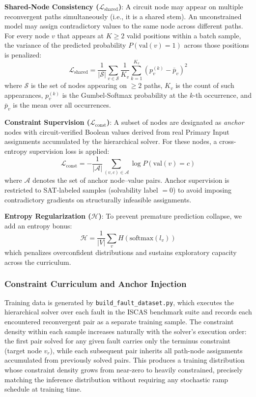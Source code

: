 \documentclass[conference]{IEEEtran}
\begin{document}
\textbf{Shared-Node Consistency ($\mathcal{L}_{\text{shared}}$)}: A circuit node may appear on multiple reconvergent paths simultaneously (i.e., it is a shared stem). An unconstrained model may assign contradictory values to the same node across different paths. For every node $v$ that appears at $K \geq 2$ valid positions within a batch sample, the variance of the predicted probability $P(\text{val}(v)=1)$ across those positions is penalized:
\begin{equation}
   \mathcal{L}_{\text{shared}} = \frac{1}{|\mathcal{S}|}\sum_{v \in \mathcal{S}}
      \frac{1}{K_v}\sum_{k=1}^{K_v}\!\left(p_v^{(k)} - \bar{p}_v\right)^2
\end{equation}
where $\mathcal{S}$ is the set of nodes appearing on $\geq 2$ paths, $K_v$ is the count of such appearances, $p_v^{(k)}$ is the Gumbel-Softmax probability at the $k$-th occurrence, and $\bar{p}_v$ is the mean over all occurrences.

\textbf{Constraint Supervision ($\mathcal{L}_{\text{const}}$)}: A subset of nodes are designated as \textit{anchor} nodes with circuit-verified Boolean values derived from real Primary Input assignments accumulated by the hierarchical solver. For these nodes, a cross-entropy supervision loss is applied:
\begin{equation}
   \mathcal{L}_{\text{const}} = -\frac{1}{|\mathcal{A}|} \sum_{(v,c) \in \mathcal{A}} \log P(\text{val}(v) = c)
\end{equation}
where $\mathcal{A}$ denotes the set of anchor node--value pairs. Anchor supervision is restricted to SAT-labeled samples (solvability label $= 0$) to avoid imposing contradictory gradients on structurally infeasible assignments.

\textbf{Entropy Regularization ($\mathcal{H}$)}: To prevent premature prediction collapse, we add an entropy bonus:
\begin{equation}
   \mathcal{H} = \frac{1}{|V|}\sum_v H\!\left(\text{softmax}(l_v)\right)
\end{equation}
which penalizes overconfident distributions and sustains exploratory capacity across the curriculum.

\subsubsection{Constraint Curriculum and Anchor Injection}
Training data is generated by \texttt{build\_fault\_dataset.py}, which executes the hierarchical solver over each fault in the ISCAS benchmark suite and records each encountered reconvergent pair as a separate training sample. The constraint density within each sample increases naturally with the solver's execution order: the first pair solved for any given fault carries only the terminus constraint (target node $v_r$), while each subsequent pair inherits all path-node assignments accumulated from previously solved pairs. This produces a training distribution whose constraint density grows from near-zero to heavily constrained, precisely matching the inference distribution without requiring any stochastic ramp schedule at training time.
\end{document}
